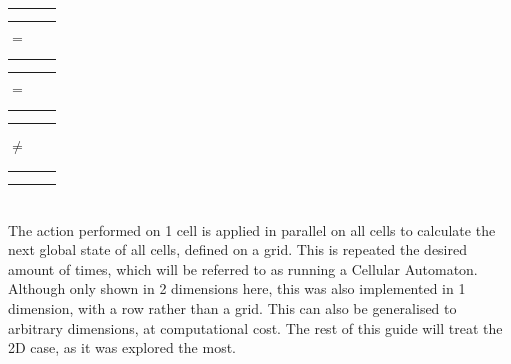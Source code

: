 \documentclass{article}
\begin{document}
	
	\begin{tabular}{ | l | c | r |}
		\hline
		\cellcolor{blue}& \cellcolor{white} &\cellcolor{white}  \\ \hline
		\cellcolor{red}& \cellcolor{black} &\cellcolor{white}  \\ \hline
		\cellcolor{white}& \cellcolor{white} &\cellcolor{white}  \\
		\hline
	\end{tabular}
	$=$
	\begin{tabular}{ | l | c | r |}
		\hline
		\cellcolor{white}& \cellcolor{red} &\cellcolor{blue}  \\ \hline
		\cellcolor{white}& \cellcolor{black} &\cellcolor{white}  \\ \hline
		\cellcolor{white}& \cellcolor{white} &\cellcolor{white}  \\
		\hline
	\end{tabular}
	$=$
	\begin{tabular}{ | l | c | r |}
		\hline
		\cellcolor{white}& \cellcolor{white} &\cellcolor{white}  \\ \hline
		\cellcolor{white}& \cellcolor{black} &\cellcolor{red}  \\ \hline
		\cellcolor{white}& \cellcolor{white} &\cellcolor{blue}  \\
		\hline
	\end{tabular}
	$\ne$
	\begin{tabular}{ | l | c | r |}
		\hline
		\cellcolor{white}& \cellcolor{white} &\cellcolor{white}  \\ \hline
		\cellcolor{red}& \cellcolor{black} &\cellcolor{white}  \\ \hline
		\cellcolor{white}& \cellcolor{white} &\cellcolor{blue}  \\
		\hline
	\end{tabular}\\
	
	The action performed on 1 cell is applied in parallel on all cells to calculate the next global state of all cells, defined on a grid. This is repeated the desired amount of times, which will be referred to as running a Cellular Automaton.\\
	
	
	Although only shown in 2 dimensions here, this was also implemented in 1 dimension, with a row rather than a grid. This can also be generalised to arbitrary dimensions, at computational cost. The rest of this guide will treat the 2D case, as it was explored the most.\\
	\newpage
\end{document}
